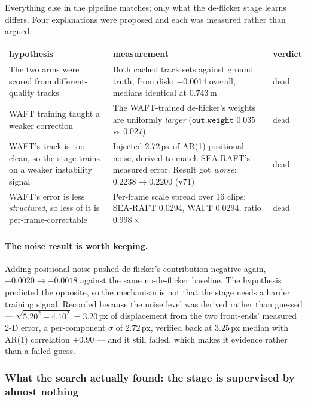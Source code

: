 \documentclass[11pt,a4paper]{article}
\begin{document}
Everything else in the pipeline matches; only what the de-flicker stage learns differs. Four
explanations were proposed and each was measured rather than argued:

\begin{center}\small
\begin{tabular}{p{5.4cm}p{6.4cm}l}
\toprule
hypothesis & measurement & verdict \\
\midrule
The two arms were scored from different-quality tracks &
Both cached track sets against ground truth, from disk: $-0.0014$ overall, medians identical at
$0.743$\,m &
dead \\
WAFT training taught a weaker correction &
The WAFT-trained de-flicker's weights are uniformly \emph{larger} ($\texttt{out.weight}$ $0.035$ vs
$0.027$) &
dead \\
WAFT's track is too clean, so the stage trains on a weaker instability signal &
Injected $2.72$\,px of AR(1) positional noise, derived to match SEA-RAFT's measured error. Result
got \emph{worse}: $0.2238 \to 0.2200$ (v71) &
dead \\
WAFT's error is less \emph{structured}, so less of it is per-frame-correctable &
Per-frame scale spread over 16 clips: SEA-RAFT $0.0294$, WAFT $0.0294$, ratio $0.998\times$ &
dead \\
\bottomrule
\end{tabular}
\end{center}

\paragraph{The noise result is worth keeping.} Adding positional noise pushed de-flicker's
contribution negative again, $+0.0020 \to -0.0018$ against the same no-de-flicker baseline. The
hypothesis predicted the opposite, so the mechanism is not that the stage needs a harder training
signal. Recorded because the noise level was derived rather than guessed --- $\sqrt{5.20^2-4.10^2}
= 3.20$\,px of displacement from the two front-ends' measured 2-D error, a per-component
$\sigma$ of $2.72$\,px, verified back at $3.25$\,px median with AR(1) correlation $+0.90$ --- and it
still failed, which makes it evidence rather than a failed guess.

\subsubsection{What the search actually found: the stage is supervised by almost nothing}
\label{sec:deflicker-supervision}
\end{document}
